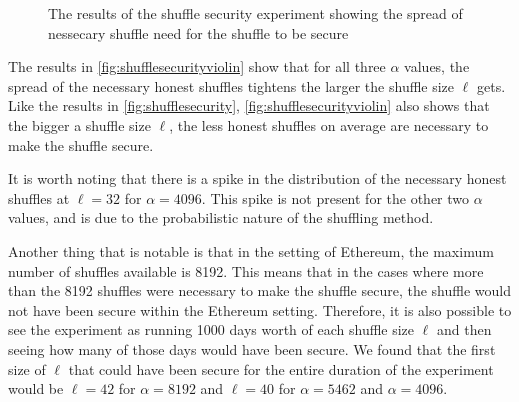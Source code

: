 \begin{figure}[!htb]
    \centering
    \qquad
    \caption{The results of the shuffle security experiment showing the spread of nessecary shuffle need for the shuffle to be secure}%
    \label{fig:shufflesecurityviolin}%
\end{figure}

The results in \autoref{fig:shufflesecurityviolin} show that for all three $\alpha$ values, the spread of the necessary honest shuffles tightens the larger the shuffle size $\ell$ gets.
Like the results in \autoref{fig:shufflesecurity}, \autoref{fig:shufflesecurityviolin} also shows that the bigger a shuffle size $\ell$, the less honest shuffles on average are necessary to make the shuffle secure.

It is worth noting that there is a spike in the distribution of the necessary honest shuffles at $\ell=32$ for $\alpha=4096$.
This spike is not present for the other two $\alpha$ values, and is due to the probabilistic nature of the shuffling method.

Another thing that is notable is that in the setting of Ethereum, the maximum number of shuffles available is 8192.
This means that in the cases where more than the 8192 shuffles were necessary to make the shuffle secure, the shuffle would not have been secure within the Ethereum setting.
Therefore, it is also possible to see the experiment as running 1000 days worth of each shuffle size $\ell$ and then seeing how many of those days would have been secure.
We found that the first size of $\ell$ that could have been secure for the entire duration of the experiment would be $\ell=42$ for $\alpha=8192$ and $\ell=40$ for $\alpha=5462$ and $\alpha=4096$.


